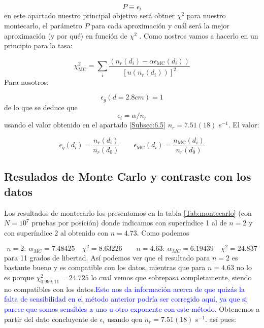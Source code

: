 \documentclass[11pt]{article}
\newcommand{\parentesis}[1]{\left( #1  \right)}
\newcommand{\ccorchetes}[1]{\left[ #1  \right]}
\begin{document}
\begin{equation}
	P \equiv \epsilon_i
\end{equation}
en este apartado nuestro principal objetivo será obtner $\chi^2$ para nuestro montecarlo, el parámetro $P$ para cada aproximación y cuál será la mejor aproximación (y por qué) en función de $\chi^2$ \cite{N6}. Como nostros vamos a hacerlo en un principio para la tasa: 

\begin{equation}
	\chi^2_{\text{MC}} = \sum_i \frac{\parentesis{n_r(d_i)- \alpha \epsilon_{\text{MC}} (d_i)}}{\ccorchetes{u(n_r(d_i))}^2}
\end{equation}
Para nosotros:

\begin{equation}
	\epsilon_g(d=2.8 \unit{cm}) = 1
\end{equation}
de lo que se deduce que
\begin{equation}
	\epsilon_i = \alpha / n_r
\end{equation}
usando el valor obtenido en el apartado \ref{Subsec:6.5} $n_r=7.51(18)$ s$^{-1}$. El valor: 

\begin{equation}
	\epsilon_g(d_i) = \frac{n_r(d_i)}{n_r(d_0)}  \qquad 
	\epsilon_{\text{MC}}(d_i) = \frac{n_\text{MC}(d_i)}{n_r(d_0)}
\end{equation}

\subsection{Resulados de Monte Carlo y contraste con los datos}

Los resultados de montecarlo los presentamos en la tabla \cref{Tab:montecarlo} (con $N=10^7$ pruebas por posición) donde indicamos con superíndice 1 al de $n=2$ y con superíndice $2$ al obtenido con $n=4.73$. Como podemos 

\begin{equation}
n = 2: \  \alpha_{MC} =  7.48425 \quad \chi^2 =8.63226 \qquad 
n = 4.63 : \  \alpha_{MC} = 6.19439 \quad \chi^2 = 24.837
\end{equation}
para 11 grados de libertad. Así podemos ver que el resultado para $n=2$ es bastante bueno y es compatible con los datos, mientras que para $n=4.63$ no lo es porque $\chi^2_{0.999,11}= 24.725$ lo cual vemos que sobrepasa completamente, siendo no compatibles con los datos.\textcolor{blue}{Esto nos da información acerca de que quizás la falta de sensibilidad en el método anterior podría ser corregido aquí, ya que si parece que somos sensibles a uno u otro exponente con este método.} Obtenemos a partir del dato concluyente de $\epsilon_i$ usando qeu $n_r=7.51(18)$ s$^{-1}$. así pues: 
\end{document}
